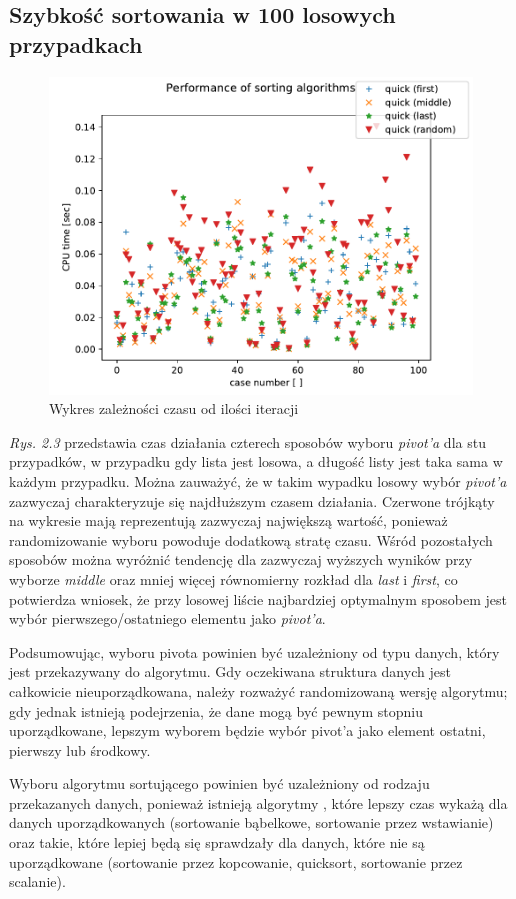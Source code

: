 \documentclass[a4paper,11pt]{report}
\begin{document}
\subsection{Szybkość sortowania w 100 losowych przypadkach}
\begin{figure}[h!]
\centering
\includegraphics[scale=1]{Figure_2.pdf}
\caption{Wykres zależności czasu od ilości iteracji}
\end{figure}

\textit{Rys. 2.3} przedstawia czas działania czterech sposobów wyboru \textit{pivot'a} dla stu przypadków, w przypadku gdy lista jest losowa, a długość listy jest taka sama w każdym przypadku. Można zauważyć, że w takim wypadku losowy wybór \textit{pivot'a} zazwyczaj charakteryzuje się najdłuższym czasem działania. Czerwone trójkąty na wykresie mają reprezentują zazwyczaj największą wartość, ponieważ randomizowanie wyboru powoduje dodatkową stratę czasu. Wśród pozostałych sposobów można wyróżnić tendencję dla zazwyczaj wyższych wyników przy wyborze \textit{middle} oraz mniej więcej równomierny rozkład dla \textit{last} i \textit{first}, co potwierdza wniosek, że przy losowej liście najbardziej optymalnym sposobem jest wybór pierwszego/ostatniego elementu jako \textit{pivot'a}.



Podsumowując, wyboru pivota powinien być uzależniony od typu danych, który jest przekazywany do algorytmu. Gdy oczekiwana struktura danych jest całkowicie nieuporządkowana, należy rozważyć randomizowaną wersję algorytmu; gdy jednak istnieją podejrzenia, że dane mogą być pewnym stopniu uporządkowane, lepszym wyborem będzie wybór pivot'a jako element ostatni, pierwszy lub środkowy.


Wyboru algorytmu sortującego powinien być uzależniony od rodzaju przekazanych danych, ponieważ istnieją algorytmy , które lepszy czas wykażą dla danych uporządkowanych (sortowanie bąbelkowe, sortowanie przez wstawianie) oraz takie, które lepiej będą się sprawdzały dla danych, które nie są uporządkowane (sortowanie przez kopcowanie, quicksort, sortowanie przez scalanie).

\nocite{*}


\end{document}
